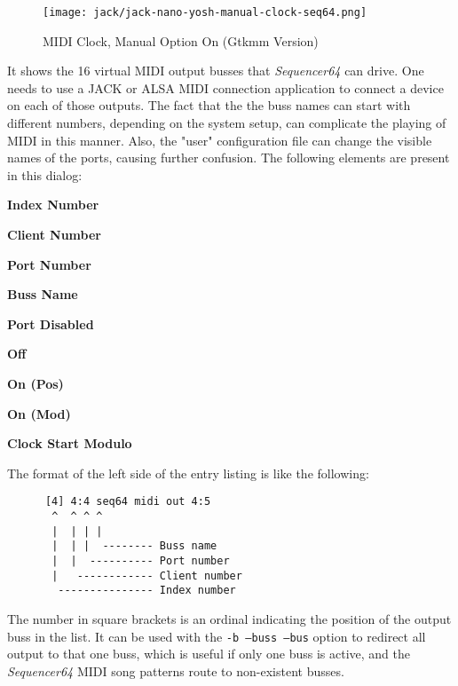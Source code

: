 \begin{figure}[H]
   \centering 
   \texttt{[image: jack/jack-nano-yosh-manual-clock-seq64.png]}
   \caption{MIDI Clock, Manual Option On (Gtkmm Version)}
   \label{fig:seq64_midi_clock_4_devices_manual_1}
\end{figure}

   It shows the 16 virtual MIDI output busses that \textsl{Sequencer64} can
   drive.  One needs to use a JACK or ALSA MIDI
   connection application to connect a device on each of those outputs.  The
   fact that the the buss names can
   start with different numbers, depending on the system setup, can complicate
   the playing of MIDI in this manner.  Also, the "user" configuration file can
   change the visible names of the ports, causing further confusion.
   The following elements are present in this dialog:

   \begin{enumber}
      \item \textbf{Index Number}
      \item \textbf{Client Number}
      \item \textbf{Port Number}
      \item \textbf{Buss Name}
      \item \textbf{Port Disabled}
      \item \textbf{Off}
      \item \textbf{On (Pos)}
      \item \textbf{On (Mod)}
      \item \textbf{Clock Start Modulo}
   \end{enumber}

   The format of the left side of the entry listing is like the following:

   \begin{verbatim}
      [4] 4:4 seq64 midi out 4:5
       ^  ^ ^ ^
       |  | | |
       |  | |  -------- Buss name
       |  |  ---------- Port number
       |   ------------ Client number
        --------------- Index number
   \end{verbatim}

   \setcounter{ItemCounter}{0}      %

   The number in square brackets is an ordinal indicating the position
   of the output buss in the list.
   It can be used with the \texttt{-b --buss --bus} option to redirect all
   output to that one buss, which is useful if only one buss is active, and the
   \textsl{Sequencer64} MIDI song patterns route to non-existent busses.

